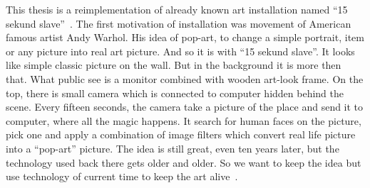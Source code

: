 This thesis is a reimplementation of already known art installation named
``15 sekund slave''~\cite{leonardo}. The first motivation of installation was
movement of American famous artist Andy Warhol. His idea of pop-art, to change
a simple portrait, item or any picture into real art picture. And so it is
with ``15 sekund slave''. It looks like simple classic picture on the wall.
But in the background it is more then that. What public see is a monitor
combined with wooden art-look frame. On the top, there is small camera which
is connected to computer hidden behind the scene. Every fifteen seconds, the
camera take a picture of the place and send it to computer, where all the
magic happens. It search for human faces on the picture, pick one and apply a
combination of image filters which convert real life picture into a ``pop-art''
picture. The idea is still great, even ten years later, but the technology
used back there gets older and older. So we want to keep the idea but use
technology of current time to keep the art alive~\cite{trifonova}.
